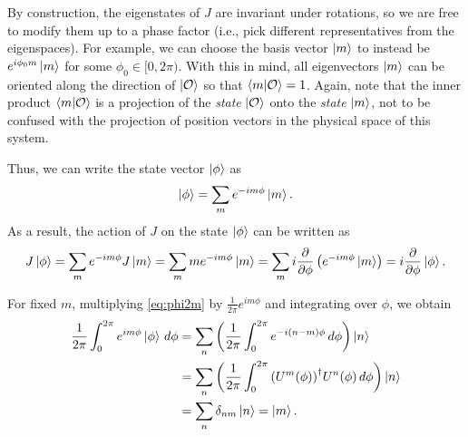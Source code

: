By construction, the eigenstates of $J$ are invariant under rotations, so we are free to modify them up to a phase factor (i.e., pick  different representatives from the eigenspaces). For example, we can choose the basis vector $\ket{m}$ to instead be $e^{i\phi_0 m}\ket{m}$ for some $\phi_0\in[0,2\pi)$.  With this in mind, all eigenvectors $\ket{m}$ can be oriented along the direction of $\ket{\mathcal{O}}$ so that $\braket{m|\mathcal{O}} = 1$. Again, note that the inner product $\braket{m|\mathcal{O}}$ is a projection of the \textit{state} $\ket{\mathcal{O}}$ onto the \textit{state} $\ket{m}$, not to be confused with the projection of position vectors in the physical space of this system.

Thus, we can write the state vector $\ket{\phi}$ as
\begin{align}
    \ket{\phi} = \sum_{m} e^{-im\phi}\ket{m}.\label{eq:phi2m}
\end{align}
As a result, the action of $J$ on the state $\ket{\phi}$ can be written as
\begin{align}
    J\ket{\phi} = \sum_{m} e^{-im\phi} J\ket{m} = \sum_{m} m e^{-im\phi}\ket{m} = \sum_{m} i \frac{\partial}{\partial\phi} \left( e^{-im\phi}\ket{m} \right) = i\frac{\partial}{\partial\phi}\ket{\phi}.
\end{align}

For fixed $m$, multiplying \cref{eq:phi2m} by $\frac{1}{2\pi} e^{im\phi}$ and integrating over $\phi$, we obtain
\begin{align}
    \begin{split}        
    \frac{1}{2\pi}\int_{0}^{2\pi} e^{im\phi}\ket{\phi} \,d\phi 
        &= \sum_n \left( \frac{1}{2\pi}\int_{0}^{2\pi}e^{-i(n-m)\phi}\,d\phi \right)\ket{n} \\
        &= \sum_n \left( \frac{1}{2\pi}\int_{0}^{2\pi}{(U^m(\phi))}^\dagger U^n(\phi)\,d\phi \right)\ket{n} \\
        &= \sum_n \delta_{nm}\ket{n} = \ket{m}.
    \end{split}
\end{align}

